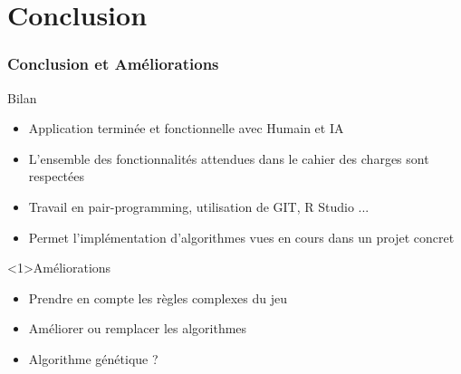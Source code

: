 \section{Conclusion}
	\begin{frame}
	\frametitle{Conclusion et Améliorations}
	\begin{block}{Bilan}
		\begin{itemize}
			\item Application terminée et fonctionnelle avec Humain et IA
			\item L'ensemble des fonctionnalités attendues dans le cahier des charges sont respectées
			\item Travail en pair-programming, utilisation de GIT, R Studio ...
			\item Permet l'implémentation d'algorithmes vues en cours dans un projet concret
		\end{itemize}
	\end{block} 
	\begin{block}{Améliorations}
		\begin{itemize}
			\item Prendre en compte les règles complexes du jeu
			\item Améliorer ou remplacer les algorithmes
			\item Algorithme génétique ?
		\end{itemize}
	\end{block} 
\end{frame}